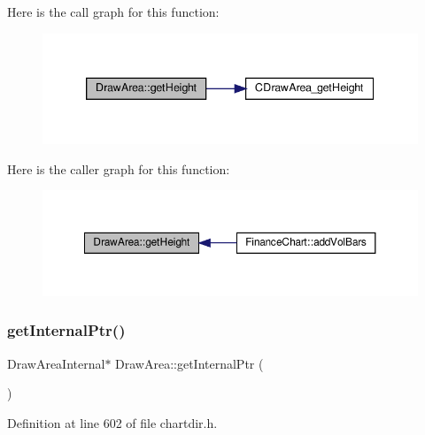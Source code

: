 Here is the call graph for this function\+:
\nopagebreak
\begin{figure}[H]
\begin{center}
\leavevmode
\includegraphics[width=339pt]{class_draw_area_a1245dcb3b871d15bf9e135302d7ba98f_cgraph}
\end{center}
\end{figure}
Here is the caller graph for this function\+:
\nopagebreak
\begin{figure}[H]
\begin{center}
\leavevmode
\includegraphics[width=350pt]{class_draw_area_a1245dcb3b871d15bf9e135302d7ba98f_icgraph}
\end{center}
\end{figure}
\mbox{\label{class_draw_area_a975123b22c1437e30bde57e1baa69778}} 
\subsubsection{\texorpdfstring{get\+Internal\+Ptr()}{getInternalPtr()}\hspace{0.1cm}{\footnotesize\ttfamily [1/2]}}
{\footnotesize\ttfamily Draw\+Area\+Internal$\ast$ Draw\+Area\+::get\+Internal\+Ptr (\begin{DoxyParamCaption}{ }\end{DoxyParamCaption})\hspace{0.3cm}{\ttfamily [inline]}}



Definition at line 602 of file chartdir.\+h.

